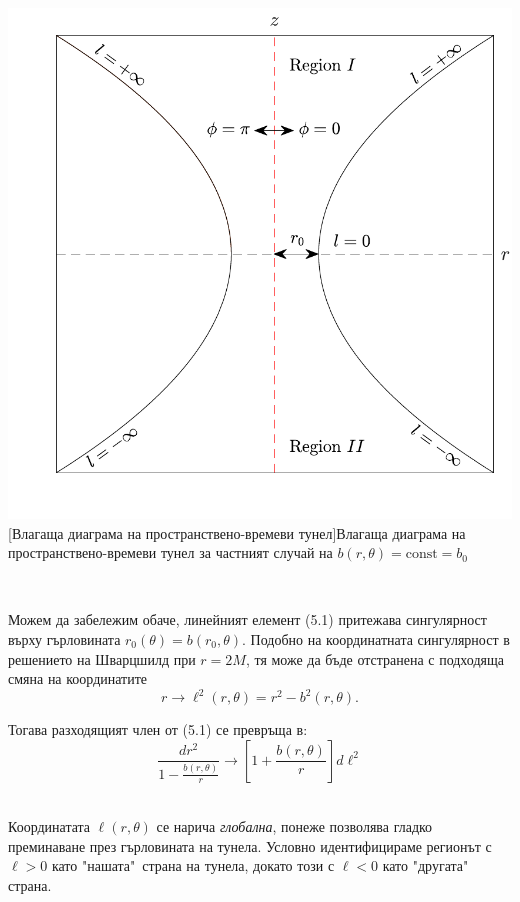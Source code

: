\noindent\begin{minipage}{15em}
	\centering
	\hspace{-0.99cm}
	\includegraphics[scale = 0.4]{WH_embedding.pdf}
	[Влагаща диаграма на пространствено-времеви тунел]{\small Влагаща диаграма на пространствено-времеви тунел за частният случай на $b(r,\theta) = \text{const} = b_0$}
	\label{WH_embedding}
\end{minipage}\,\,
\begin{minipage}{20em}
	Можем да забележим обаче, линейният елемент (5.1) притежава сингулярност върху гърловината $r_0(\theta) = b(r_0,\theta)$. Подобно на координатната сингулярност в решението на Шварцшилд при $r = 2M$, тя може да бъде отстранена с подходяща смяна на координатите 
	\begin{equation}
	r	 \rightarrow \ell^2(r,\theta) = r^2 - b^2(r,\theta).
	\end{equation}
	
	Тогава разходящият член от (5.1) се превръща в:
	\begin{equation}
		\frac{dr^2}{1 - \frac{b(r,\theta)}{r}} \rightarrow \left[1 + \frac{b(r,\theta)}{r}\right]d\ell^2
	\end{equation}
	
\end{minipage}\\\newline
Координатата $\ell(r,\theta)$ се нарича \emph{глобална}, понеже позволява гладко преминаване през гърловината на тунела. Условно идентифицираме регионът с $\ell >0$ като "нашата"$\,$ страна на тунела, докато този с $\ell < 0$ като "другата"$\,$ страна.\\

